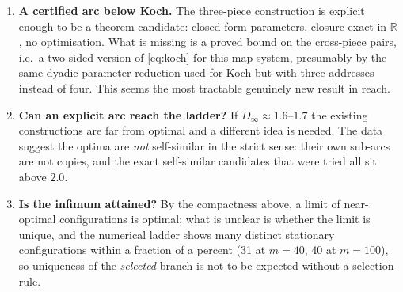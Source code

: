 \documentclass[11pt]{article}
\theoremstyle{remark}
\newcommand{\R}{\mathbb{R}}
\begin{document}
\begin{enumerate}[label=(\alph*)]
\item \textbf{A certified arc below Koch.} The three-piece construction is explicit enough to be a
  theorem candidate: closed-form parameters, closure exact in $\R$, no optimisation. What is
  missing is a proved bound on the cross-piece pairs, i.e.\ a two-sided version of \eqref{eq:koch}
  for this map system, presumably by the same dyadic-parameter reduction used for Koch but with
  three addresses instead of four. This seems the most tractable genuinely new result in reach.
\item \textbf{Can an explicit arc reach the ladder?} If $D_\infty\approx1.6$--$1.7$ the existing
  constructions are far from optimal and a different idea is needed. The data suggest the optima
  are \emph{not} self-similar in the strict sense: their own sub-arcs are not copies, and the
  exact self-similar candidates that were tried all sit above $2.0$.
\item \textbf{Is the infimum attained?} By the compactness above, a limit of near-optimal
  configurations is optimal; what is unclear is whether the limit is unique, and the numerical
  ladder shows many distinct stationary configurations within a fraction of a percent
  (31 at $m=40$, 40 at $m=100$), so uniqueness of the \emph{selected} branch is not to be expected
  without a selection rule.


\end{enumerate}
\end{document}
